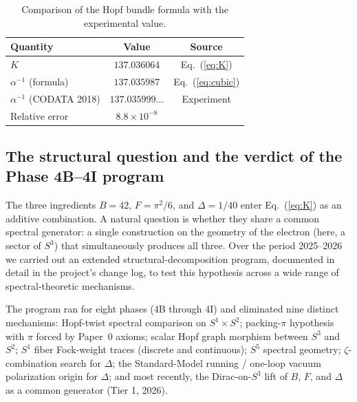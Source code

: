 \documentclass[aps,prl,twocolumn,superscriptaddress]{revtex4-2}
\begin{document}
\begin{table}[h]
\centering
\begin{tabular}{lcc}
\hline\hline
Quantity & Value & Source \\
\hline
$K$ & $137.036064$ & Eq.~(\ref{eq:K}) \\
$\alpha^{-1}$ (formula) & $137.035987$ & Eq.~(\ref{eq:cubic}) \\
$\alpha^{-1}$ (CODATA 2018) & $137.035999\ldots$ & Experiment \\
\hline
Relative error & $8.8 \times 10^{-8}$ & \\
\hline\hline
\end{tabular}
\caption{Comparison of the Hopf bundle formula with the experimental
value.}
\label{tab:comparison}
\end{table}

\subsection{The structural question and the verdict of the Phase 4B--4I
program}\label{sec:structural_question}

The three ingredients $B = 42$, $F = \pi^2/6$, and $\Delta = 1/40$ enter
Eq.~(\ref{eq:K}) as an additive combination. A natural question is
whether they share a common spectral generator: a single construction
on the geometry of the electron (here, a sector of $S^3$) that
simultaneously produces all three. Over the period 2025--2026 we
carried out an extended structural-decomposition program, documented in
detail in the project's change log, to test this hypothesis across a
wide range of spectral-theoretic mechanisms.

The program ran for eight phases (4B through 4I) and eliminated nine
distinct mechanisms:
Hopf-twist spectral comparison on $S^1 \times S^2$;
packing-$\pi$ hypothesis with $\pi$ forced by Paper~0 axioms;
scalar Hopf graph morphism between $S^3$ and $S^2$;
$S^1$ fiber Fock-weight traces (discrete and continuous);
$S^5$ spectral geometry;
$\zeta$-combination search for $\Delta$;
the Standard-Model running / one-loop vacuum polarization origin for
$\Delta$;
and most recently, the Dirac-on-$S^3$ lift of $B$, $F$, and $\Delta$ as
a common generator (Tier 1, 2026).
\end{document}
